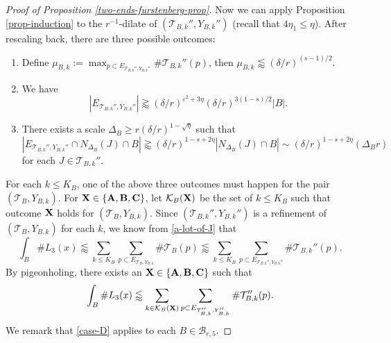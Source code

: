 \documentclass{amsart}
\numberwithin{equation}{section}
\newcommand{\de}{\delta}
\newcommand{\De}{\Delta}
\newcommand{\e}{\varepsilon}
\newcommand{\cb}{\mathcal B}
\newcommand{\ck}{{\mathcal K}}
\newcommand{\cT}{{\mathcal T}}
\begin{document}
\begin{proof}[Proof of Proposition \ref{two-ends-furstenberg-prop}]
Now we can apply Proposition \ref{prop-induction} to the $r^{-1}$-dilate of $(\cT_{B,k}'', Y_{B,k}'')$ (recall that $4\eta_1\leq\eta$). 
After rescaling back, there are three possible outcomes: 
\begin{enumerate}
    \item[{\bf A.}]  Define $\mu_{B,k}:=\max_{p\subset E_{\cT_{B,k}'', Y_{B,k}''}} \# \cT_{B,k}''(p) $, then $\mu_{B,k}\lessapprox (\de/r)^{(s-1)/2}$.
    \item[{\bf B.}] We have
    \begin{equation}
        |E_{\cT_{B,k}'', Y_{B,k}''}|\gtrapprox (\de/r)^{\e^2+3\eta}(\de/r)^{3(1-s)/2}|B|.
    \end{equation}
    \item[{\bf C.}] There exists a scale $\De_B\geq r(\de/r)^{1-\sqrt{\eta}}$ such that $|E_{\cT_{B,k}'', Y_{B,k}''}\cap N_{\De_B}(J)\cap B |\gtrapprox (\de/r)^{1-s+2\eta}|N_{\De_B}(J)\cap B|\sim (\de/r)^{1-s+2\eta}(\De_B r)$ for each $J\in \cT_{B,k}''$.
\end{enumerate}

For each $k\leq K_B$, one of the above three outcomes must happen for the pair $(\cT_B,Y_{B,k})$. 
For $\bf X\in\{\bf A, B, C\}$, let $\ck_B({\bf X})$ be the set of $k\leq K_B$ such that outcome $\bf X$ holds for $(\cT_B,Y_{B,k})$.  
Since $(\cT_{B,k}'', Y_{B,k}'')$ is a refinement of $(\cT_B, Y_{B,k})$ for each $k$, we know from \eqref{a-lot-of-J} that
\begin{equation}
    \int_{B}\#L_3(x)\lessapprox\sum_{{k\leq K_B}}\sum_{p\subset E_{\cT_B, Y_{B,k}}}\#\cT_B(p)\lessapprox\sum_{k\leq K_B}\sum_{p\subset E_{\cT_{B,k}'', Y_{B,k}''}}\#\cT_{B,k}''(p).
\end{equation}
By pigeonholing, there exists an $\bf X\in\{\bf A, B, C\}$ such that 
\begin{equation}
\label{case-D}
    \int_{B}\#L_3(x)\lessapprox\sum_{k\in\ck_B(\bf X)}\sum_{p\subset E_{\cT_{B,k}'', Y_{B,k}''}}\#\cT_{B,k}''(p).
\end{equation}
We remark that \eqref{case-D} applies to each $B\in\cb_{r,5}$. 

\medskip



\end{proof}
\end{document}
